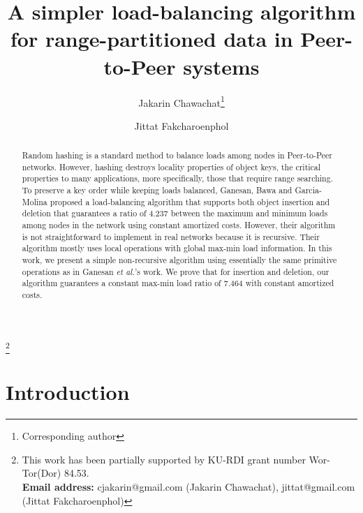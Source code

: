 \documentclass[a4paper]{article}
\begin{document}


\title{A simpler load-balancing algorithm for range-partitioned data
  in Peer-to-Peer systems}
\author{Jakarin Chawachat\thanks{Corresponding author}}
\author{Jittat Fakcharoenphol}

\maketitle
\let\thefootnote\relax\footnote{ This work has been partially supported by KU-RDI grant number Wor-Tor(Dor) 84.53.\\
\textbf{Email address:} cjakarin@gmail.com (Jakarin Chawachat), jittat@gmail.com (Jittat Fakcharoenphol)}
\begin{abstract}
  Random hashing is a standard method to balance loads among nodes in
  Peer-to-Peer networks. However, hashing destroys locality properties of
  object keys, the critical properties to many applications, more
  specifically, those that require range searching. To preserve a key
  order while keeping loads balanced, Ganesan, Bawa and Garcia-Molina
  proposed a load-balancing algorithm that supports both object
  insertion and deletion that guarantees a ratio of 4.237 between the
  maximum and minimum loads among nodes in the network using constant
  amortized costs. However, their algorithm is not straightforward to
  implement in real networks because it is recursive.  Their algorithm
  mostly uses local operations with global max-min load information.
  In this work, we present a simple non-recursive algorithm using
  essentially the same primitive operations as in Ganesan {\em et
    al.}'s work.  We prove that for insertion and deletion, our
  algorithm guarantees a constant max-min load ratio of 7.464 with
  constant amortized costs.
\end{abstract}

\newcommand{\minbalance}{{\sc MinBalance}}
\newcommand{\split}{{\sc Split}}
\newcommand{\splitmax}{{\sc SplitMax}}
\newcommand{\splitnbr}{{\sc SplitNbr}}
\newcommand{\nbradj}{{\sc NbrAdjust}}
\newcommand{\reorder}{{\sc Reorder}}
\newcommand{\adjload}{{\sc AdjustLoad}}

\section{Introduction}
\end{document}
